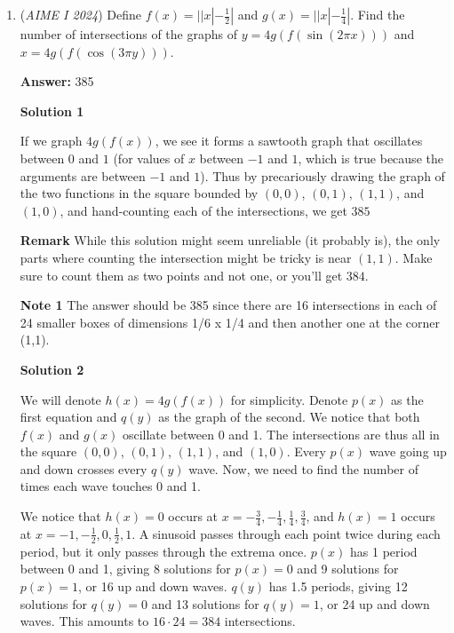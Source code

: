 \begin{enumerate}
 In total, $b=4$ yields $2+8+4+8=22$ configurations.

 There are $22+93=115$ configurations in total. There are $2^8=256$ total cases, so the probability is $\frac{115}{256}$. Adding them up, we get $115+256=\boxed{371}$.

 


	\item (\textit{AIME I 2024}) Define $f(x)=|| x|-\frac{1}{2}|$ and $g(x)=|| x|-\frac{1}{4}|$. Find the number of intersections of the graphs of $y=4g(f(\sin (2 \pi x)))$ and $x=4g(f(\cos (3 \pi y)))$.


 
 \textbf{Answer: }385



\textbf{Solution 1}

If we graph $4g(f(x))$, we see it forms a sawtooth graph that oscillates between $0$ and $1$ (for values of $x$ between $-1$ and $1$, which is true because the arguments are between $-1$ and $1$). Thus by precariously drawing the graph of the two functions in the square bounded by $(0,0)$, $(0,1)$, $(1,1)$, and $(1,0)$, and hand-counting each of the intersections, we get $\boxed{385}$

 \textbf{Remark} While this solution might seem unreliable (it probably is), the only parts where counting the intersection might be tricky is near $(1,1)$. Make sure to count them as two points and not one, or you'll get $384$.

 \textbf{Note 1} The answer should be 385 since there are 16 intersections in each of 24 smaller boxes of dimensions 1/6 x 1/4 and then another one at the corner (1,1).

 



\textbf{Solution 2}

We will denote $h(x)=4g(f(x))$ for simplicity. Denote $p(x)$ as the first equation and $q(y)$ as the graph of the second. We notice that both $f(x)$ and $g(x)$ oscillate between 0 and 1. The intersections are thus all in the square $(0,0)$, $(0,1)$, $(1,1)$, and $(1,0)$. Every $p(x)$ wave going up and down crosses every $q(y)$ wave. Now, we need to find the number of times each wave touches 0 and 1.

 
We notice that $h(x)=0$ occurs at $x=-\frac{3}{4}, -\frac{1}{4}, \frac{1}{4}, \frac{3}{4}$, and $h(x)=1$ occurs at $x=-1, -\frac{1}{2}, 0,\frac{1}{2},1$. A sinusoid passes through each point twice during each period, but it only passes through the extrema once. $p(x)$ has 1 period between 0 and 1, giving 8 solutions for $p(x)=0$ and 9 solutions for $p(x)=1$, or 16 up and down waves. $q(y)$ has 1.5 periods, giving 12 solutions for $q(y)=0$ and 13 solutions for $q(y)=1$, or 24 up and down waves. This amounts to $16\cdot24=384$ intersections.


\end{enumerate}
